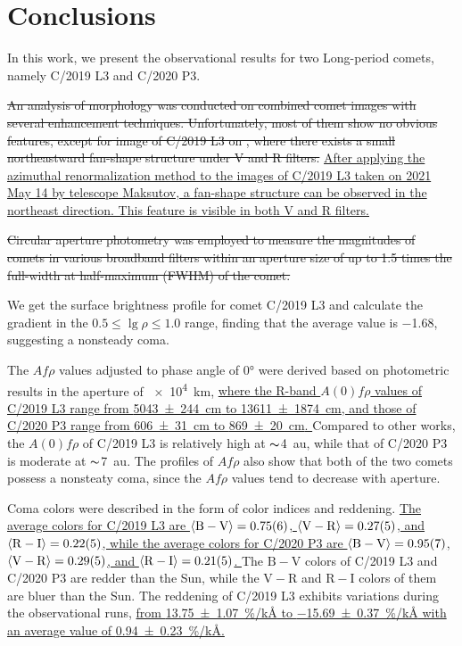 \section{Conclusions} \label{sec:con}
In this work, we present the observational results for two Long-period comets, namely C/2019 L3 and C/2020 P3. 

\st{An analysis of morphology was conducted on combined comet images with several enhancement techniques. Unfortunately, most of them show no obvious features, except for image of C/2019 L3 on , where there exists a small northeastward fan-shape structure under V and R filters. }
\ul{
    After applying the azimuthal renormalization method to the images of C/2019 L3 taken on 2021 May 14 by telescope Maksutov, a fan-shape structure can be observed in the northeast direction. This feature is visible in both V and R filters. 
}

\st{Circular aperture photometry was employed to measure the magnitudes of comets in various broadband filters within an aperture size of up to 1.5 times the full-width at half-maximum (FWHM) of the comet. }

We get the surface brightness profile for comet C/2019 L3 and calculate the gradient in the $0.5 \leqslant \lg{\rho} \leqslant 1.0$ range, finding that the average value is \num{-1.68}, suggesting a nonsteady coma. 

The $Af\rho$ values adjusted to phase angle of \ang{0} were derived based on photometric results in the aperture of \SI{e4}{\km}, 
\ul{
    where the R-band $A(0)f\rho$ values of C/2019 L3 range from {\SI{5043 +- 244}{\cm}} to {\SI{13611 +- 1874}{\cm}}, and those of C/2020 P3 range from {\SI{606 +- 31}{\cm}} to {\SI{869 +- 20}{\cm}}. 
}
Compared to other works, the $A(0)f\rho$ of C/2019 L3 is relatively high at $\thicksim${\SI{4}{\astronomicalunit}}, while that of C/2020 P3 is moderate at $\thicksim${\SI{7}{\astronomicalunit}}. The profiles of $Af\rho$ also show that both of the two comets possess a nonsteaty coma, since the $Af\rho$ values tend to decrease with aperture. 

Coma colors were described in the form of color indices and reddening. 
\ul{
    The average colors for C/2019 L3 are  
$\langle \mathrm{B} - \mathrm{V} \rangle = \num{0.75 +- 0.06}$, 
$\langle \mathrm{V} - \mathrm{R} \rangle = \num{0.27 +- 0.05}$, and 
$\langle \mathrm{R} - \mathrm{I} \rangle = \num{0.22 +- 0.05}$,  
while the average colors for C/2020 P3 are 
$\langle \mathrm{B} - \mathrm{V} \rangle = \num{0.95 +- 0.07}$, 
$\langle \mathrm{V} - \mathrm{R} \rangle = \num{0.29 +- 0.05}$, and 
$\langle \mathrm{R} - \mathrm{I} \rangle = \num{0.21 +- 0.05}$. 
}
The $\mathrm{B} - \mathrm{V}$ colors of C/2019 L3 and C/2020 P3 are redder than the Sun, while the $\mathrm{V} - \mathrm{R}$ and $\mathrm{R} - \mathrm{I}$ colors of them are bluer than the Sun. The reddening of C/2019 L3 exhibits variations during the observational runs, 
\ul{
    from {\SI{13.75 +- 1.07}{\percent/\kilo\angstrom}} to {\SI{-15.69 +- 0.37}{\percent/\kilo\angstrom}} with an average value of {\SI{0.94 +- 0.23}{\percent/\kilo\angstrom}}. 
}

